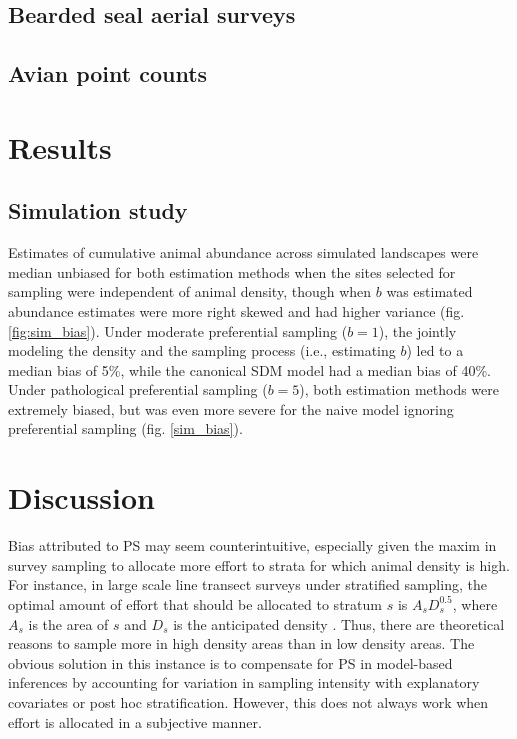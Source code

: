 \documentclass[times,mee,doublespace,]{besauth2}
\begin{document}
\subsection{Bearded seal aerial surveys}

\subsection{Avian point counts}



\section{Results}

\subsection{Simulation study}

Estimates of cumulative animal abundance across simulated landscapes were median unbiased for both estimation methods when the sites selected for sampling were independent of animal density, though when $b$ was estimated abundance estimates were more right skewed and had higher variance (fig. \ref{fig:sim_bias}).  Under moderate preferential sampling ($b=1$), the jointly modeling the density and the sampling process (i.e., estimating $b$) led to a median bias of 5\%, while the canonical SDM model had a median bias of 40\%.  Under pathological preferential sampling ($b=5$), both estimation methods were extremely biased, but was even more severe for the naive model ignoring preferential sampling (fig. \ref{sim_bias}).

\section{Discussion}

Bias attributed to PS may seem counterintuitive, especially given the maxim in survey sampling to allocate more effort to strata for which animal density is high. For instance, in large scale line transect surveys under stratified sampling, the optimal amount of effort that should be allocated to stratum $s$ is $A_s D_s^{0.5}$, where $A_s$ is the area of $s$ and $D_s$ is the anticipated density \citep[][eqn 7.7]{BucklandEtAl2001}.  Thus, there are theoretical reasons to sample more in high density areas than in low density areas. The obvious solution in this instance is to compensate for PS in model-based inferences by accounting for variation in sampling intensity with explanatory covariates or post hoc stratification. However, this does not always work when effort is allocated in a subjective manner.
\end{document}
